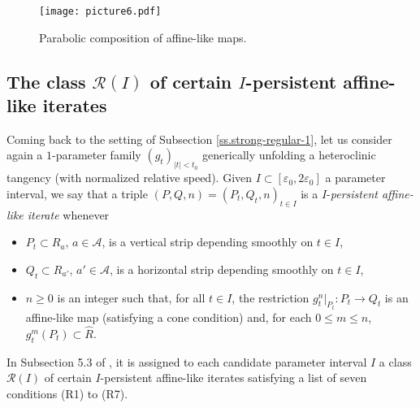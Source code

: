 \documentclass[12pt]{amsart}
\numberwithin{equation}{section}
\theoremstyle{definition}
\newcommand{\<}{{\langle}}
\renewcommand{\>}{{\rangle}}
\begin{document}
\begin{figure}[hbt!]
\texttt{[image: picture6.pdf]}
\caption{Parabolic composition of affine-like maps.}
\end{figure}

\subsection{The class $\mathcal{R}(I)$ of certain $I$-persistent affine-like iterates} Coming back to the setting of Subsection \ref{ss.strong-regular-1}, let us consider again a $1$-parameter family $(g_t)_{|t|<t_0}$ generically unfolding a heteroclinic tangency (with normalized relative speed). Given $I\subset [\varepsilon_0,2\varepsilon_0]$ a parameter interval, we say that a triple $(P,Q,n)=(P_t, Q_t, n)_{t\in I}$ is a $I$-\emph{persistent affine-like iterate} whenever 
\begin{itemize}
\item $P_t\subset R_a$, $a\in\mathcal{A}$, is a vertical strip depending smoothly on $t\in I$, 
\item $Q_t\subset R_{a'}$, $a'\in\mathcal{A}$, is a horizontal strip depending smoothly on $t\in I$,
\item $n\geq 0$ is an integer such that, for all $t\in I$, the restriction $g_t^n|_{P_t}:P_t\to Q_t$ is an affine-like map (satisfying a cone condition) and, for each $0\leq m\leq n$, $g_t^m(P_t)\subset\widehat{R}$.
\end{itemize}

In Subsection 5.3 of \cite{PY09}, it is assigned to each candidate parameter interval $I$ a class $\mathcal{R}(I)$ of certain $I$-persistent affine-like iterates satisfying a list of seven conditions (R1) to (R7). 
\end{document}
